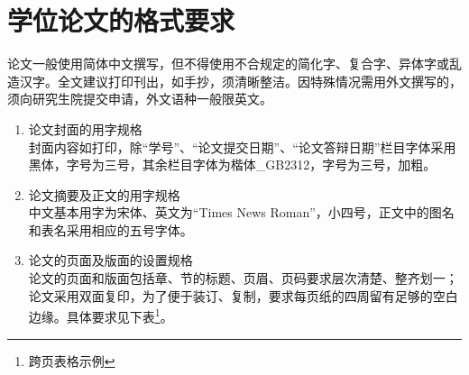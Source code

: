 \section{学位论文的格式要求}
论文一般使用简体中文撰写，但不得使用不合规定的简化字、复合字、异体字或乱造汉字。全文建议打印刊出，如手抄，须清晰整洁。因特殊情况需用外文撰写的，须向研究生院提交申请，外文语种一般限英文。
\begin{enumerate}
    \item 论文封面的用字规格\\
    封面内容如打印，除“学号”、“论文提交日期”、“论文答辩日期”栏目字体采用黑体，字号为三号，其余栏目字体为楷体\_GB2312，字号为三号，加粗。
    \item 论文摘要及正文的用字规格\\
    中文基本用字为宋体、英文为“Times News Roman”，小四号，正文中的图名和表名采用相应的五号字体。
    \item 论文的页面及版面的设置规格\\
    论文的页面和版面包括章、节的标题、页眉、页码要求层次清楚、整齐划一；论文采用双面复印，为了便于装订、复制，要求每页纸的四周留有足够的空白边缘。具体要求见下表\footnote{跨页表格示例}。
\end{enumerate}


